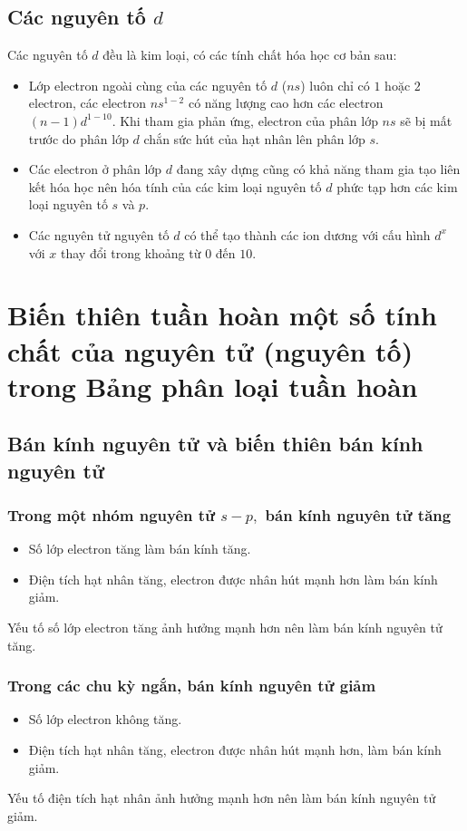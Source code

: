 \subsection{Các nguyên tố $d$}
Các nguyên tố $d$ đều là kim loại, có các tính chất hóa học cơ bản sau:
\begin{itemize}
\item Lớp electron ngoài cùng của các nguyên tố $d$ ($ns$) luôn chỉ có $1$ hoặc $2$ electron, các electron $ns^{1-2}$ có năng lượng cao hơn các electron $\left( {n - 1} \right)d^{1-10}.$ Khi tham gia phản ứng, electron của phân lớp $ns$ sẽ bị mất trước do phân lớp $d$ chắn sức hút của hạt nhân lên phân lớp $s.$
\item Các electron ở phân lớp $d$ đang xây dựng cũng có khả năng tham gia tạo liên kết hóa học nên hóa tính của các kim loại nguyên tố $d$ phức tạp hơn các kim loại nguyên tố $s$ và $p.$
\item Các nguyên tử nguyên tố $d$ có thể tạo thành các ion dương với cấu hình $d^x$ với $x$ thay đổi trong khoảng từ $0$ đến $10.$
\end{itemize}
\section{Biến thiên tuần hoàn một số tính chất của nguyên tử (nguyên tố) trong Bảng phân loại tuần hoàn}
\subsection{Bán kính nguyên tử và biến thiên bán kính nguyên tử}
\subsubsection{Trong một nhóm nguyên tử $s - p,$ bán kính nguyên tử tăng}
\begin{itemize}
\item Số lớp electron tăng làm bán kính tăng.
\item Điện tích hạt nhân tăng, electron được nhân hút mạnh hơn làm bán kính giảm.
\end{itemize}
Yếu tố số lớp electron tăng ảnh hưởng mạnh hơn nên làm bán kính nguyên tử tăng.
\subsubsection{Trong các chu kỳ ngắn, bán kính nguyên tử giảm}
\begin{itemize}
\item Số lớp electron không tăng.
\item Điện tích hạt nhân tăng, electron được nhân hút mạnh hơn, làm bán kính giảm.
\end{itemize}
Yếu tố điện tích hạt nhân ảnh hưởng mạnh hơn nên làm bán kính nguyên tử giảm.
